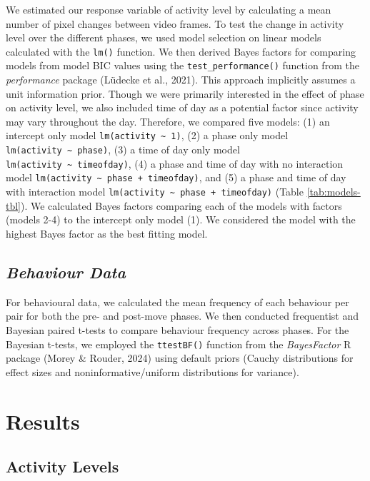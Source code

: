 \documentclass[
  pub]{apa6}
\begin{document}
We estimated our response variable of activity level by calculating a mean number of pixel changes between video frames. To test the change in activity level over the different phases, we used model selection on linear models calculated with the \texttt{lm()} function. We then derived Bayes factors for comparing models from model BIC values using the \texttt{test\_performance()} function from the \emph{performance} package (Lüdecke et al., 2021). This approach implicitly assumes a unit information prior. Though we were primarily interested in the effect of phase on activity level, we also included time of day as a potential factor since activity may vary throughout the day. Therefore, we compared five models: (1) an intercept only model \texttt{lm(activity\ \textasciitilde{}\ 1)}, (2) a phase only model \texttt{lm(activity\ \textasciitilde{}\ phase)}, (3) a time of day only model \texttt{lm(activity\ \textasciitilde{}\ timeofday)}, (4) a phase and time of day with no interaction model \texttt{lm(activity\ \textasciitilde{}\ phase\ +\ timeofday)}, and (5) a phase and time of day with interaction model \texttt{lm(activity\ \textasciitilde{}\ phase\ +\ timeofday)} (Table \ref{tab:models-tbl}). We calculated Bayes factors comparing each of the models with factors (models 2-4) to the intercept only model (1). We considered the model with the highest Bayes factor as the best fitting model.

\subsection{\texorpdfstring{\emph{Behaviour Data}}{Behaviour Data}}\label{behaviour-data}

For behavioural data, we calculated the mean frequency of each behaviour per pair for both the pre- and post-move phases. We then conducted frequentist and Bayesian paired t-tests to compare behaviour frequency across phases. For the Bayesian t-tests, we employed the \texttt{ttestBF()} function from the \emph{BayesFactor} R package (Morey \& Rouder, 2024) using default priors (Cauchy distributions for effect sizes and noninformative/uniform distributions for variance).

\section{Results}\label{results}

\subsection{Activity Levels}\label{activity-levels-2}
\end{document}
